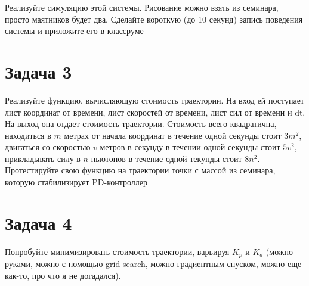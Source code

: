\documentclass{article}
\begin{document}
Реализуйте симуляцию этой системы. Рисование можно взять из семинара, просто маятников будет два. Сделайте короткую (до 10 секунд) запись поведения системы и приложите его в классруме

\section*{Задача 3}

Реализуйте функцию, вычисляющую стоимость траектории.
На вход ей поступает лист координат от времени, лист скоростей от времени, лист сил от времени и dt. На выход она отдает стоимость траектории.
Стоимость всего квадратична, находиться в $m$ метрах от начала координат в течение одной секунды стоит $3 m^2$, двигаться со скоростью $v$ метров в секунду в течении одной секунды стоит $5 v^2$, прикладывать силу в $n$ ньютонов в течение одной текунды стоит $8 n^2$.
Протестируйте свою функцию на траектории точки с массой из семинара, которую стабилизирует PD-контроллер

\section*{Задача 4}

Попробуйте минимизировать стоимость траектории, варьируя $K_p$ и $K_d$ (можно руками, можно с помощью grid search, можно градиентным спуском, можно еще как-то, про что я не догадался).
\end{document}
